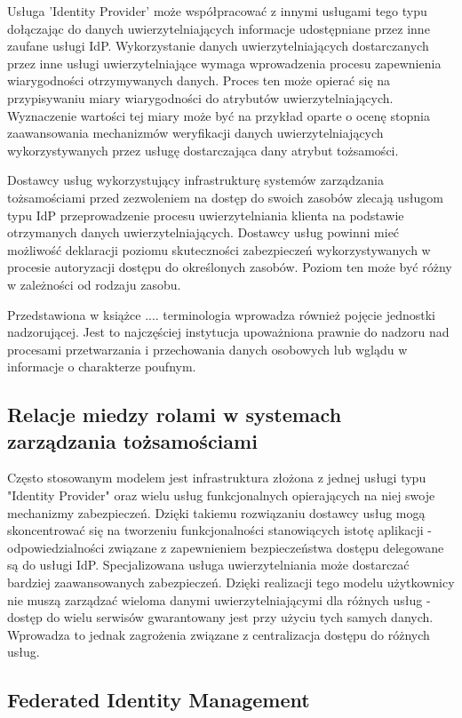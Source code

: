 Usługa 'Identity Provider' może współpracować z innymi usługami tego typu dołączając do danych uwierzytelniających informacje udostępniane przez inne zaufane usługi IdP. Wykorzystanie danych uwierzytelniających dostarczanych przez inne usługi uwierzytelniające wymaga wprowadzenia procesu zapewnienia wiarygodności otrzymywanych danych. Proces ten może opierać się na przypisywaniu miary wiarygodności do atrybutów uwierzytelniających. Wyznaczenie wartości tej miary może być na przykład oparte o ocenę stopnia zaawansowania mechanizmów weryfikacji danych uwierzytelniających wykorzystywanych przez usługę dostarczająca dany atrybut tożsamości.

Dostawcy usług wykorzystujący infrastrukturę systemów zarządzania tożsamościami przed zezwoleniem na dostęp do swoich zasobów zlecają usługom typu IdP przeprowadzenie procesu uwierzytelniania klienta na podstawie otrzymanych danych uwierzytelniających. Dostawcy usług powinni mieć możliwość deklaracji poziomu skuteczności zabezpieczeń wykorzystywanych w procesie autoryzacji dostępu do określonych zasobów. Poziom ten może być różny w zależności od rodzaju zasobu.

Przedstawiona w książce .... terminologia wprowadza również pojęcie jednostki nadzorującej. Jest to najczęściej instytucja upoważniona prawnie do nadzoru nad procesami przetwarzania i przechowania danych osobowych lub wglądu  w informacje o charakterze poufnym.

\subsection{Relacje miedzy rolami w systemach zarządzania tożsamościami}

Często stosowanym modelem jest infrastruktura złożona z jednej usługi typu "Identity Provider" oraz wielu usług funkcjonalnych opierających na niej swoje mechanizmy zabezpieczeń. Dzięki takiemu rozwiązaniu dostawcy usług mogą skoncentrować się na tworzeniu funkcjonalności stanowiących istotę aplikacji - odpowiedzialności związane z zapewnieniem bezpieczeństwa dostępu delegowane są do usługi IdP. Specjalizowana usługa uwierzytelniania może dostarczać bardziej zaawansowanych zabezpieczeń. Dzięki realizacji tego modelu użytkownicy nie muszą zarządzać wieloma danymi uwierzytelniającymi dla różnych usług - dostęp do wielu serwisów gwarantowany jest przy użyciu tych samych danych. Wprowadza to jednak zagrożenia związane z centralizacja dostępu do różnych usług.

\subsection{Federated Identity Management}

